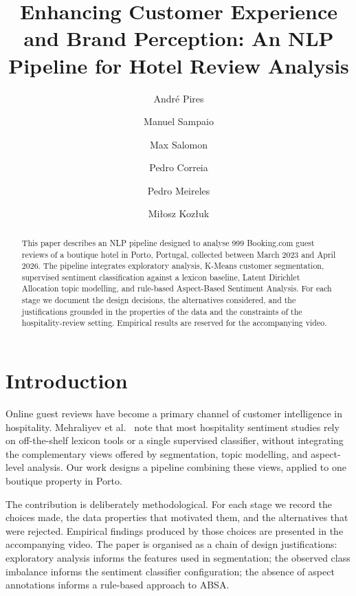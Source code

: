 \documentclass[runningheads]{llncs}
\begin{document}
\title{Enhancing Customer Experience and Brand Perception: An NLP Pipeline for Hotel Review Analysis}

\author{
  Andr\'{e} Pires\and Manuel Sampaio\and Max Salomon\and
  Pedro Correia\and Pedro Meireles\and Mi\l{}osz Koz\l{}uk
}

\maketitle

\begin{abstract}
This paper describes an NLP pipeline designed to analyse 999 Booking.com
guest reviews of a boutique hotel in Porto, Portugal, collected between
March 2023 and April 2026. The pipeline integrates exploratory analysis,
K-Means customer segmentation, supervised sentiment classification against
a lexicon baseline, Latent Dirichlet Allocation topic modelling, and
rule-based Aspect-Based Sentiment Analysis. For each stage we document the
design decisions, the alternatives considered, and the justifications
grounded in the properties of the data and the constraints of the
hospitality-review setting. Empirical results are reserved for the
accompanying video.
\end{abstract}

\section{Introduction}

Online guest reviews have become a primary channel of customer
intelligence in hospitality. Mehraliyev et al.~\cite{mehraliyev2022}
note that most hospitality sentiment studies rely on off-the-shelf
lexicon tools or a single supervised classifier, without integrating
the complementary views offered by segmentation, topic modelling, and
aspect-level analysis. Our work designs a pipeline combining these
views, applied to one boutique property in Porto.

The contribution is deliberately methodological. For each stage we
record the choices made, the data properties that motivated them, and
the alternatives that were rejected. Empirical findings produced by
those choices are presented in the accompanying video. The paper is
organised as a chain of design justifications: exploratory analysis
informs the features used in segmentation; the observed class imbalance
informs the sentiment classifier configuration; the absence of aspect
annotations informs a rule-based approach to ABSA.
\end{document}
